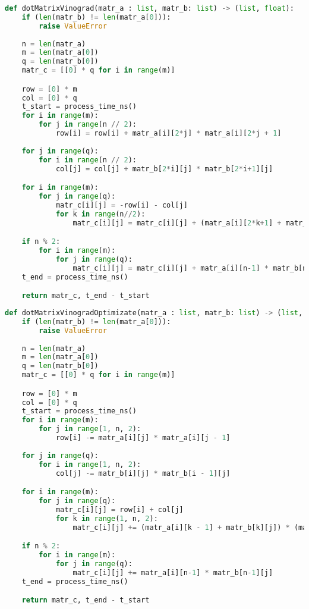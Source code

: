         \begin{lstlisting}[language=python, label=lst:vinogradDot, caption=Реализация алгоритма Винограда умножения матриц]
def dotMatrixVinograd(matr_a : list, matr_b: list) -> (list, float):
    if (len(matr_b) != len(matr_a[0])):
        raise ValueError
    
    n = len(matr_a)
    m = len(matr_a[0])
    q = len(matr_b[0])
    matr_c = [[0] * q for i in range(m)]

    row = [0] * m
    col = [0] * q
    t_start = process_time_ns()
    for i in range(m):
        for j in range(n // 2):
            row[i] = row[i] + matr_a[i][2*j] * matr_a[i][2*j + 1]
    
    for j in range(q):
        for i in range(n // 2):
            col[j] = col[j] + matr_b[2*i][j] * matr_b[2*i+1][j]

    for i in range(m):
        for j in range(q):
            matr_c[i][j] = -row[i] - col[j]
            for k in range(n//2):
                matr_c[i][j] = matr_c[i][j] + (matr_a[i][2*k+1] + matr_b[2*k][j]) * (matr_a[i][2*k] + matr_b[2*k+1][j])

    if n % 2:
        for i in range(m):
            for j in range(q):
                matr_c[i][j] = matr_c[i][j] + matr_a[i][n-1] * matr_b[n-1][j]
    t_end = process_time_ns()

    return matr_c, t_end - t_start
        \end{lstlisting}

        \begin{lstlisting}[language=python, label=lst:vinogradDot:optimize, caption=Реализация оптимизированного алгоритма Винограда умножения матриц]
def dotMatrixVinogradOptimizate(matr_a : list, matr_b: list) -> (list, float):
    if (len(matr_b) != len(matr_a[0])):
        raise ValueError
    
    n = len(matr_a)
    m = len(matr_a[0])
    q = len(matr_b[0])
    matr_c = [[0] * q for i in range(m)]

    row = [0] * m
    col = [0] * q
    t_start = process_time_ns()
    for i in range(m):
        for j in range(1, n, 2):
            row[i] -= matr_a[i][j] * matr_a[i][j - 1]
    
    for j in range(q):
        for i in range(1, n, 2):
            col[j] -= matr_b[i][j] * matr_b[i - 1][j]

    for i in range(m):
        for j in range(q):
            matr_c[i][j] = row[i] + col[j]
            for k in range(1, n, 2):
                matr_c[i][j] += (matr_a[i][k - 1] + matr_b[k][j]) * (matr_a[i][k] + matr_b[k-1][j])

    if n % 2:
        for i in range(m):
            for j in range(q):
                matr_c[i][j] += matr_a[i][n-1] * matr_b[n-1][j]
    t_end = process_time_ns()

    return matr_c, t_end - t_start
        \end{lstlisting}
    
